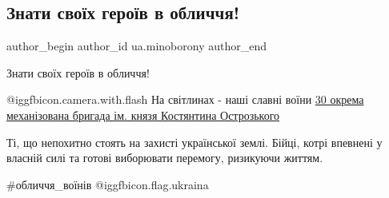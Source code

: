  
 
 
 
 
 
\subsection{Знати своїх героїв в обличчя!}
\label{sec:27_05_2022.fb.ua.minoborony.1.znaty_geroiv}
 
\ifcmt
 author_begin
   author_id ua.minoborony
 author_end
\fi

Знати своїх героїв в обличчя!

@igg{fbicon.camera.with.flash} На світлинах - наші славні воїни
\href{https://www.facebook.com/30brigade}{30 окрема механізована бригада ім.
князя Костянтина Острозького}

Ті, що непохитно стоять на захисті української землі. Бійці, котрі впевнені у
власній силі та готові виборювати перемогу, ризикуючи життям. 

\#обличчя\_воїнів @igg{fbicon.flag.ukraina}
